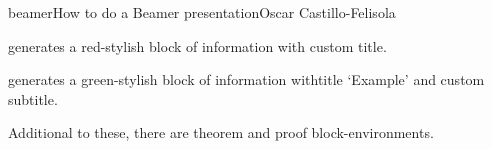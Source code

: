 \begin{article}[2]{beamer}{How to do a Beamer presentation}{Oscar Castillo-Felisola}

  generates a red-stylish block of information with custom title.




  generates a green-stylish block of information withtitle `Example’ and custom subtitle.

  Additional to these, there are theorem and proof block-environments.
\end{article}
